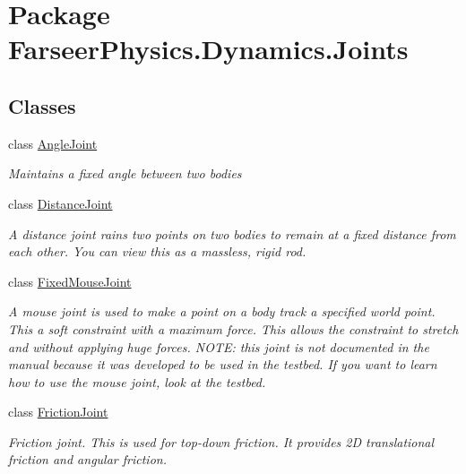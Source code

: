 \hypertarget{namespace_farseer_physics_1_1_dynamics_1_1_joints}{\section{Package Farseer\+Physics.\+Dynamics.\+Joints}
\label{namespace_farseer_physics_1_1_dynamics_1_1_joints}
}
\subsection*{Classes}
\begin{DoxyCompactItemize}
\item 
class \hyperlink{class_farseer_physics_1_1_dynamics_1_1_joints_1_1_angle_joint}{Angle\+Joint}
\begin{DoxyCompactList}\small\item\em Maintains a fixed angle between two bodies \end{DoxyCompactList}\item 
class \hyperlink{class_farseer_physics_1_1_dynamics_1_1_joints_1_1_distance_joint}{Distance\+Joint}
\begin{DoxyCompactList}\small\item\em A distance joint rains two points on two bodies to remain at a fixed distance from each other. You can view this as a massless, rigid rod. \end{DoxyCompactList}\item 
class \hyperlink{class_farseer_physics_1_1_dynamics_1_1_joints_1_1_fixed_mouse_joint}{Fixed\+Mouse\+Joint}
\begin{DoxyCompactList}\small\item\em A mouse joint is used to make a point on a body track a specified world point. This a soft constraint with a maximum force. This allows the constraint to stretch and without applying huge forces. N\+O\+T\+E\+: this joint is not documented in the manual because it was developed to be used in the testbed. If you want to learn how to use the mouse joint, look at the testbed. \end{DoxyCompactList}\item 
class \hyperlink{class_farseer_physics_1_1_dynamics_1_1_joints_1_1_friction_joint}{Friction\+Joint}
\begin{DoxyCompactList}\small\item\em Friction joint. This is used for top-\/down friction. It provides 2\+D translational friction and angular friction. \end{DoxyCompactList}\item 

\end{DoxyCompactItemize}
